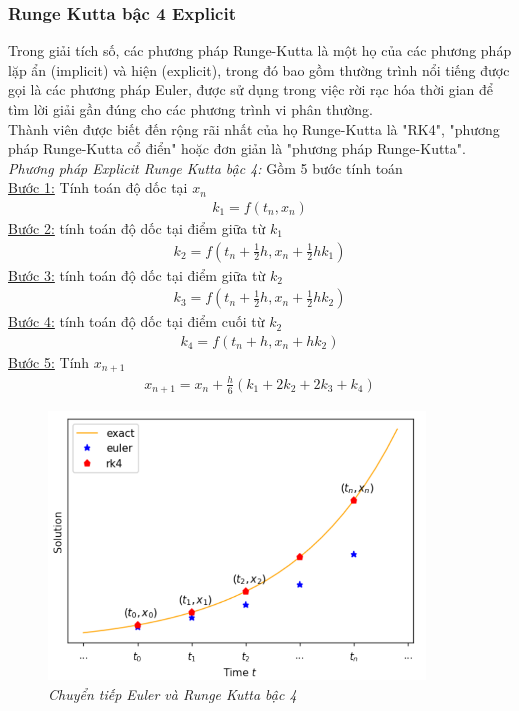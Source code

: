 \documentclass[13pt,a4paper]{article}
\begin{document}
			\subsubsection{Runge Kutta bậc 4 Explicit}
				Trong giải tích số, các phương pháp Runge-Kutta là một họ của các phương pháp lặp ẩn (implicit) và hiện (explicit), trong đó bao gồm thường trình nổi tiếng được gọi là các phương pháp Euler, được sử dụng trong việc rời rạc hóa thời gian để tìm lời giải gần đúng cho các phương trình vi phân thường. \\
				Thành viên được biết đến rộng rãi nhất của họ Runge-Kutta là "RK4", "phương pháp Runge-Kutta cổ điển" hoặc đơn giản là "phương pháp Runge-Kutta". \\
				\textit{Phương pháp Explicit Runge Kutta bậc 4:} Gồm 5 bước tính toán \\
					\underline{Bước 1:} Tính toán độ dốc tại $x_n$
						\begin{align*}
							k_1 = f(t_n, x_n)
						\end{align*}
					\underline{Bước 2:} tính toán độ dốc tại điểm giữa từ $k_1$
						\begin{align*}
							k_2 = f(t_n + \frac{1}{2}h, x_n + \frac{1}{2}hk_1)
						\end{align*}
					\underline{Bước 3:} tính toán độ dốc tại điểm giữa từ $k_2$
						\begin{align*}
							k_3 = f(t_n + \frac{1}{2}h, x_n + \frac{1}{2}hk_2)
						\end{align*}
					\underline{Bước 4:} tính toán độ dốc tại điểm cuối từ $k_2$
						\begin{align*}
							k_4 = f(t_n + h, x_n + hk_2)
						\end{align*}
					\underline{Bước 5:} Tính $x_{n+1}$
						\begin{align*}
							x_{n+1} = x_n + \frac{h}{6}(k_1 + 2k_2 + 2k_3 + k_4)
						\end{align*}
				\begin{figure}[h!]
					\begin{center}
						\includegraphics[width=10cm]{kutta.png}
						\caption{\textit{Chuyển tiếp Euler và Runge Kutta bậc 4}}
					\end{center}
				\end{figure}
\end{document}

